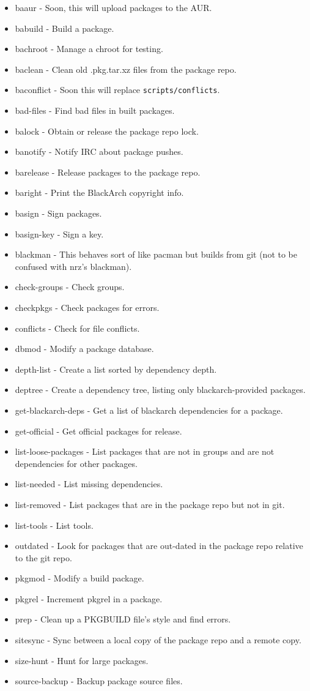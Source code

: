 \documentclass[a4paper, oneside, 11pt]{book}
\begin{document}
\begin{itemize}
	\item baaur - Soon, this will upload packages to the AUR.
	\item babuild - Build a package.
	\item bachroot - Manage a chroot for testing.
	\item baclean - Clean old .pkg.tar.xz files from the package repo.
	\item baconflict - Soon this will replace \verb|scripts/conflicts|.
	\item bad-files - Find bad files in built packages.
	\item balock - Obtain or release the package repo lock.
	\item banotify - Notify IRC about package pushes.
	\item barelease - Release packages to the package repo.
	\item baright - Print the BlackArch copyright info.
	\item basign - Sign packages.
	\item basign-key - Sign a key.
	\item blackman - This behaves sort of like pacman but builds from git (not to be confused with nrz's blackman).
	\item check-groups - Check groups.
	\item checkpkgs - Check packages for errors.
	\item conflicts - Check for file conflicts.
	\item dbmod - Modify a package database.
	\item depth-list - Create a list sorted by dependency depth.
	\item deptree - Create a dependency tree, listing only blackarch-provided packages.
	\item get-blackarch-deps - Get a list of blackarch dependencies for a package.
	\item get-official - Get official packages for release.
	\item list-loose-packages - List packages that are not in groups and are not dependencies for other packages.
	\item list-needed - List missing dependencies.
	\item list-removed - List packages that are in the package repo but not in git.
	\item list-tools - List tools.
	\item outdated - Look for packages that are out-dated in the package repo relative to the git repo.
	\item pkgmod - Modify a build package.
	\item pkgrel - Increment pkgrel in a package.
	\item prep - Clean up a PKGBUILD file's style and find errors.
	\item sitesync - Sync between a local copy of the package repo and a remote copy.
	\item size-hunt - Hunt for large packages.
	\item source-backup - Backup package source files.
\end{itemize}
\end{document}
